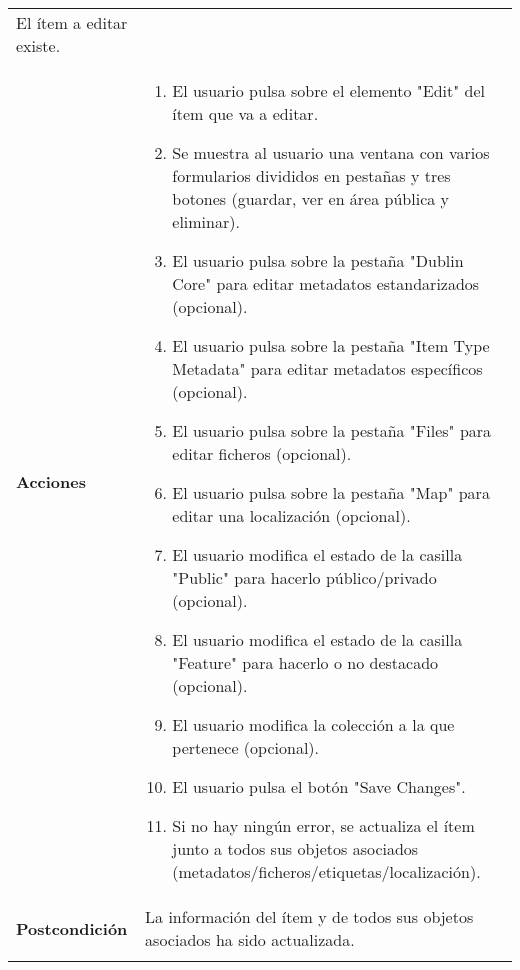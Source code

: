 \begin{longtable}[]{@{}ll@{}}
\begin{minipage}[t]{0.79\columnwidth}
El ítem a editar existe.\strut
\end{minipage}\tabularnewline
\begin{minipage}[t]{0.15\columnwidth}\raggedright
\textbf{Acciones}\strut
\end{minipage} & \begin{minipage}[t]{0.79\columnwidth}\raggedright
\begin{enumerate}
\def\labelenumi{\arabic{enumi}.}
\tightlist
\item
  El usuario pulsa sobre el elemento "Edit" del ítem que va a editar.
\item
  Se muestra al usuario una ventana con varios formularios divididos en
  pestañas y tres botones (guardar, ver en área pública y eliminar).
\item
  El usuario pulsa sobre la pestaña "Dublin Core" para editar metadatos
  estandarizados (opcional).
\item
  El usuario pulsa sobre la pestaña "Item Type Metadata" para editar
  metadatos específicos (opcional).
\item
  El usuario pulsa sobre la pestaña "Files" para editar ficheros
  (opcional).
\item
  El usuario pulsa sobre la pestaña "Map" para editar una localización
  (opcional).
\item
  El usuario modifica el estado de la casilla "Public" para hacerlo
  público/privado (opcional).
\item
  El usuario modifica el estado de la casilla "Feature" para hacerlo o
  no destacado (opcional).
\item
  El usuario modifica la colección a la que pertenece (opcional).
\item
  El usuario pulsa el botón "Save Changes".
\item
  Si no hay ningún error, se actualiza el ítem junto a todos sus objetos
  asociados (metadatos/ficheros/etiquetas/localización).
\end{enumerate}\strut
\end{minipage}\tabularnewline
\begin{minipage}[t]{0.15\columnwidth}\raggedright
\textbf{Postcondición}\strut
\end{minipage} & \begin{minipage}[t]{0.79\columnwidth}\raggedright
La información del ítem y de todos sus objetos asociados ha sido
actualizada.\strut
\end{minipage}\tabularnewline
\begin{minipage}[t]{0.15\columnwidth}\raggedright

\end{minipage}
\end{longtable}
